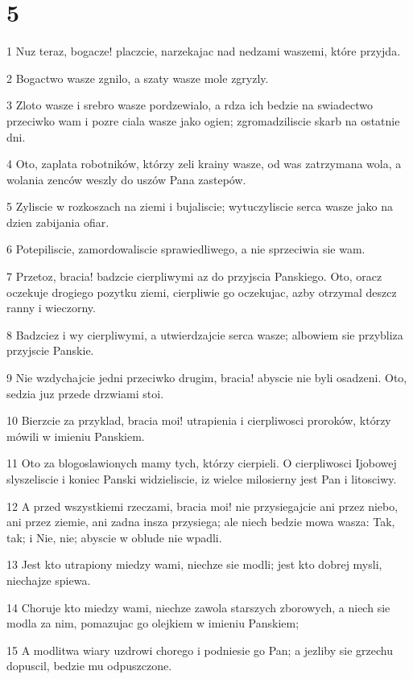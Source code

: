 \chapter{5}

\par 1 Nuz teraz, bogacze! placzcie, narzekajac nad nedzami waszemi, które przyjda.
\par 2 Bogactwo wasze zgnilo, a szaty wasze mole zgryzly.
\par 3 Zloto wasze i srebro wasze pordzewialo, a rdza ich bedzie na swiadectwo przeciwko wam i pozre ciala wasze jako ogien; zgromadziliscie skarb na ostatnie dni.
\par 4 Oto, zaplata robotników, którzy zeli krainy wasze, od was zatrzymana wola, a wolania zenców weszly do uszów Pana zastepów.
\par 5 Zyliscie w rozkoszach na ziemi i bujaliscie; wytuczyliscie serca wasze jako na dzien zabijania ofiar.
\par 6 Potepiliscie, zamordowaliscie sprawiedliwego, a nie sprzeciwia sie wam.
\par 7 Przetoz, bracia! badzcie cierpliwymi az do przyjscia Panskiego. Oto, oracz oczekuje drogiego pozytku ziemi, cierpliwie go oczekujac, azby otrzymal deszcz ranny i wieczorny.
\par 8 Badzciez i wy cierpliwymi, a utwierdzajcie serca wasze; albowiem sie przybliza przyjscie Panskie.
\par 9 Nie wzdychajcie jedni przeciwko drugim, bracia! abyscie nie byli osadzeni. Oto, sedzia juz przede drzwiami stoi.
\par 10 Bierzcie za przyklad, bracia moi! utrapienia i cierpliwosci proroków, którzy mówili w imieniu Panskiem.
\par 11 Oto za blogoslawionych mamy tych, którzy cierpieli. O cierpliwosci Ijobowej slyszeliscie i koniec Panski widzieliscie, iz wielce milosierny jest Pan i litosciwy.
\par 12 A przed wszystkiemi rzeczami, bracia moi! nie przysiegajcie ani przez niebo, ani przez ziemie, ani zadna insza przysiega; ale niech bedzie mowa wasza: Tak, tak; i Nie, nie; abyscie w oblude nie wpadli.
\par 13 Jest kto utrapiony miedzy wami, niechze sie modli; jest kto dobrej mysli, niechajze spiewa.
\par 14 Choruje kto miedzy wami, niechze zawola starszych zborowych, a niech sie modla za nim, pomazujac go olejkiem w imieniu Panskiem;
\par 15 A modlitwa wiary uzdrowi chorego i podniesie go Pan; a jezliby sie grzechu dopuscil, bedzie mu odpuszczone.
